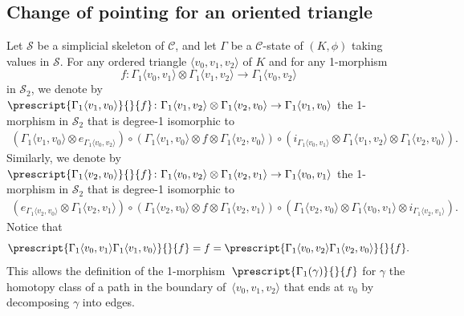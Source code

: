 \documentclass[a4paper, oneside]{amsart}
\numberwithin{equation}{subsection}
\theoremstyle{referencedlemma}
\theoremstyle{plain} %
\theoremstyle{remark}
\begin{document}
\subsection{Change of pointing for an oriented triangle}
Let $\mathcal{S}$ be a simplicial skeleton of $\mathcal{C}$, and let $\Gamma$ be a $\mathcal{C}$-state of $(K,\phi)$ taking values in $\mathcal{S}$.  For any ordered triangle $\langle v_0,v_1,v_2\rangle$ of $K$ and for any 1-morphism
$$f\colon \Gamma_1\langle v_0,v_1\rangle \otimes \Gamma_1\langle v_1, v_2\rangle \to \Gamma_1\langle v_0,v_2\rangle$$
in $\mathcal{S}_2$, we denote by $\prescript{\Gamma_1\langle v_1, v_0\rangle}{}{f}\colon \Gamma_1\langle v_1, v_2\rangle \otimes \Gamma_1\langle v_2, v_0\rangle \to \Gamma_1\langle v_1, v_0\rangle$ the 1-morphism in $\mathcal{S}_2$ that is degree-1 isomorphic to 
\begin{align*}
(\Gamma_1\langle v_1, v_0\rangle \otimes e_{\Gamma_1\langle v_0, v_2\rangle}) \circ (\Gamma_1\langle v_1, v_0\rangle \otimes f \otimes \Gamma_1\langle v_2, v_0\rangle)\circ ( i_{\Gamma_1\langle v_0,v_1\rangle} \otimes \Gamma_1\langle v_1, v_2\rangle \otimes \Gamma_1\langle v_2, v_0\rangle).
\end{align*}
Similarly, we denote by $\prescript{\Gamma_1\langle v_2, v_0\rangle}{}{f}\colon  \Gamma_1\langle v_0, v_2\rangle \otimes \Gamma_1\langle v_2, v_1\rangle \to \Gamma_1\langle v_0, v_1\rangle$ the 1-morphism in $\mathcal{S}_2$ that is degree-1 isomorphic to 
\begin{align*}
(e_{\Gamma_1\langle v_2, v_0\rangle }\otimes \Gamma_1\langle v_2, v_1\rangle )\circ (\Gamma_1\langle v_2,v_0\rangle \otimes f \otimes \Gamma_1\langle v_2, v_1\rangle ) \circ (\Gamma_1\langle v_2,v_0\rangle \otimes \Gamma_1\langle v_0,v_1\rangle \otimes i_{\Gamma_1\langle v_2, v_1\rangle}).
\end{align*}
Notice that
$$
\prescript{\Gamma_1\langle v_0, v_1\rangle \Gamma_1\langle v_1, v_0\rangle}{}{f} = f = \prescript{\Gamma_1\langle v_0, v_2\rangle \Gamma_1\langle v_2, v_0\rangle}{}{f}.
$$
This allows the definition of the 1-morphism~$\prescript{\Gamma_1(\gamma)}{}{f}$ for $\gamma$ the homotopy class of a path in the boundary of~$\langle v_0, v_1, v_2\rangle$ that ends at $v_0$ by decomposing $\gamma$ into edges.
\end{document}
